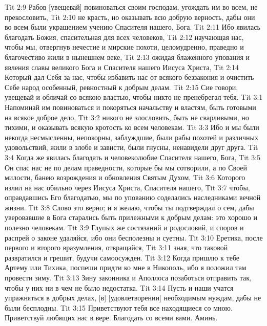 Tit 2:9  Рабов [увещевай] повиноваться своим господам, угождать им во всем, не прекословить,
Tit 2:10  не красть, но оказывать всю добрую верность, дабы они во всем были украшением учению Спасителя нашего, Бога.
Tit 2:11  Ибо явилась благодать Божия, спасительная для всех человеков,
Tit 2:12  научающая нас, чтобы мы, отвергнув нечестие и мирские похоти, целомудренно, праведно и благочестиво жили в нынешнем веке,
Tit 2:13  ожидая блаженного упования и явления славы великого Бога и Спасителя нашего Иисуса Христа,
Tit 2:14  Который дал Себя за нас, чтобы избавить нас от всякого беззакония и очистить Себе народ особенный, ревностный к добрым делам.
Tit 2:15  Сие говори, увещевай и обличай со всякою властью, чтобы никто не пренебрегал тебя.
Tit 3:1  Напоминай им повиноваться и покоряться начальству и властям, быть готовыми на всякое доброе дело,
Tit 3:2  никого не злословить, быть не сварливыми, но тихими, и оказывать всякую кротость ко всем человекам.
Tit 3:3  Ибо и мы были некогда несмысленны, непокорны, заблуждшие, были рабы похотей и различных удовольствий, жили в злобе и зависти, были гнусны, ненавидели друг друга.
Tit 3:4  Когда же явилась благодать и человеколюбие Спасителя нашего, Бога,
Tit 3:5  Он спас нас не по делам праведности, которые бы мы сотворили, а по Своей милости, банею возрождения и обновления Святым Духом,
Tit 3:6  Которого излил на нас обильно через Иисуса Христа, Спасителя нашего,
Tit 3:7  чтобы, оправдавшись Его благодатью, мы по упованию соделались наследниками вечной жизни.
Tit 3:8  Слово это верно; и я желаю, чтобы ты подтверждал о сем, дабы уверовавшие в Бога старались быть прилежными к добрым делам: это хорошо и полезно человекам.
Tit 3:9  Глупых же состязаний и родословий, и споров и распрей о законе удаляйся, ибо они бесполезны и суетны.
Tit 3:10  Еретика, после первого и второго вразумления, отвращайся,
Tit 3:11  зная, что таковой развратился и грешит, будучи самоосужден.
Tit 3:12  Когда пришлю к тебе Артему или Тихика, поспеши придти ко мне в Никополь, ибо я положил там провести зиму.
Tit 3:13  Зину законника и Аполлоса позаботься отправить так, чтобы у них ни в чем не было недостатка.
Tit 3:14  Пусть и наши учатся упражняться в добрых делах, [в] [удовлетворении] необходимым нуждам, дабы не были бесплодны.
Tit 3:15  Приветствуют тебя все находящиеся со мною. Приветствуй любящих нас в вере. Благодать со всеми вами. Аминь.


